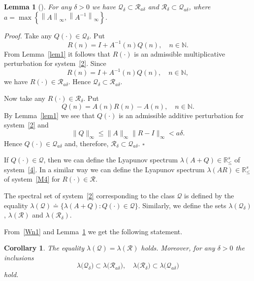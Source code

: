 \documentclass[11pt]{article}
\newtheorem{corollary}[theorem]{Corollary}
\newtheorem{lemma}[theorem]{Lemma}
\begin{document}
\begin{lemma}[\protect\cite{BP}]
\label{lem2}
\it
For any $\delta >0$ we have $\mathcal{Q}_{\delta }\subset
\mathcal{R}_{a\delta }$ and $\mathcal{R}_{\delta }\subset \mathcal{Q}%
_{a\delta }$, where $a=\max \left\{ \left\| A\right\| _{\infty
},\left\| A^{-1}\right\| _{\infty }\right\} $.
\end{lemma}

\emph{Proof.}
Take any $Q(\cdot)\in\mathcal{Q}_{\delta}$. Put
\begin{equation*}
R(n)=I+A^{-1}(n)Q(n),\quad n\in \mathbb{N}.
\end{equation*}
From Lemma~\ref{lem1} it follows that $R(\cdot)$ is an admissible
multiplicative perturbation for system~\eqref{2}.
Since 
\begin{equation*}
R(n)=I+A^{-1}(n)Q(n),\quad n\in \mathbb{N},
\end{equation*}
we have $R(\cdot)\in\mathcal{R}_{a\delta }$. Hence $\mathcal{Q}_{\delta }\subset
\mathcal{R}_{a\delta }$.

Now take any $R(\cdot)\in\mathcal{R}_{\delta }$. Put
\begin{equation*}
Q(n)=A(n)R(n)-A(n),\quad n\in \mathbb{N}.
\end{equation*}
By Lemma~\ref{lem1} we see that $Q(\cdot )$ is an admissible additive
perturbation for system~\eqref{2} and%
\begin{equation*}
\| Q\| _{\infty }\le \| A\| _{\infty }\| R-I\| _{\infty
}<a\delta .
\end{equation*}%
Hence $Q(\cdot)\in\mathcal{Q}_{a\delta }$ and, therefore, $\mathcal{R}_{\delta }\subset \mathcal{Q}%
_{a\delta }$.
\hfill $\square$



If $Q(\cdot)\in\mathcal Q$,
then we can define the Lyapunov spectrum $\lambda (A+Q)\in \mathbb{R}_{\le}^{s}$ of system~\eqref{4}.
In a similar way we can define the Lyapunov spectrum $\lambda (AR)\in \mathbb{R}_{\le}^{s}$ of system~\eqref{M4}
for $R(\cdot)\in\mathcal R$.

The spectral set of system~\eqref{2} corresponding to the class $\mathcal{Q}$ is defined by the equality
$\lambda(\mathcal{Q})\doteq\bigl\{\lambda(A+Q)\colon Q(\cdot)\in\mathcal Q\bigr\}$.
Similarly, we define the sets
$\lambda(\mathcal{Q}_{\delta})$, $\lambda(\mathcal{R})$ and $\lambda(\mathcal{R}_{\delta})$.

From~\eqref{Wn1} and 
Lemma~\ref{lem2} we get the following statement.

\begin{corollary}
\it
The equality $\lambda (\mathcal{Q})=\lambda (\mathcal{R})$ holds. 
Moreover,
for any $\delta >0$ 
the inclusions
\begin{equation*}
\lambda \bigl(\mathcal{Q}_{\delta }\bigr)\subset \lambda \bigl(\mathcal{R}_{a\delta }\bigr),\quad
\lambda \bigl(\mathcal{R}_{\delta }\bigr)\subset \lambda \bigl(\mathcal{Q}_{a\delta }\bigr)
\end{equation*}
hold.
\end{corollary}
\end{document}
